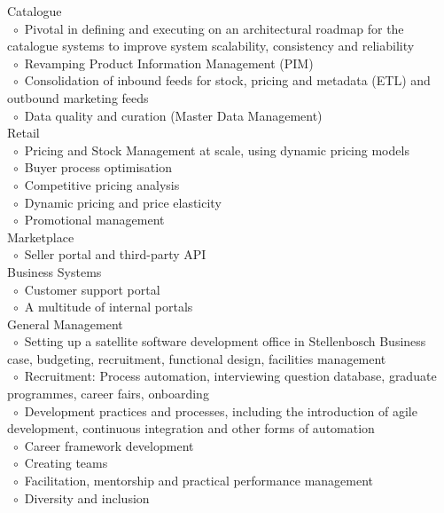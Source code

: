 \documentclass[10pt,a4paper,final]{columncv}
\newcommand{\cvitembullet}{~$\circ$~}
\newcommand{\cvitempbullet}{\phantom{\cvitembullet}}
\begin{document}
\begin{cvenv}
{          Catalogue \\
      		  \cvitembullet Pivotal in defining and executing on an architectural roadmap for  
      		  \cvitempbullet the catalogue systems to improve system scalability, consistency 
      		  \cvitempbullet and reliability \\
      		  \cvitembullet Revamping Product Information Management (PIM) \\
      		  \cvitembullet Consolidation of inbound feeds for stock, pricing and metadata 
      		  \cvitempbullet (ETL) and outbound marketing feeds \\
      		  \cvitembullet Data quality and curation (Master Data Management) \\
          Retail \\
            \cvitembullet Pricing and Stock Management at scale, using dynamic pricing 
            \cvitempbullet models \\
            \cvitembullet Buyer process optimisation \\
            \cvitembullet Competitive pricing analysis \\
            \cvitembullet Dynamic pricing and price elasticity \\
            \cvitembullet Promotional management \\
          Marketplace \\
            \cvitembullet Seller portal and third-party API \\
          Business Systems \\
            \cvitembullet Customer support portal \\
            \cvitembullet A multitude of internal portals \\
    		  General Management \\
      		  \cvitembullet Setting up a satellite software development office in Stellenbosch
      		  \cvitempbullet Business case, budgeting, recruitment, functional design,
            \cvitempbullet facilities management \\
      		  \cvitembullet Recruitment: Process automation, interviewing question database,  
      		  \cvitempbullet graduate programmes, career fairs, onboarding \\
      		  \cvitembullet Development practices and processes, including the introduction 
      		  \cvitempbullet of agile development, continuous integration and other forms of 
      		  \cvitempbullet automation \\
            \cvitembullet Career framework development \\
      		  \cvitembullet Creating teams \\ %
      		  \cvitembullet Facilitation, mentorship and practical performance management \\
            \cvitembullet Diversity and inclusion
          }
\end{cvenv}
\end{document}
